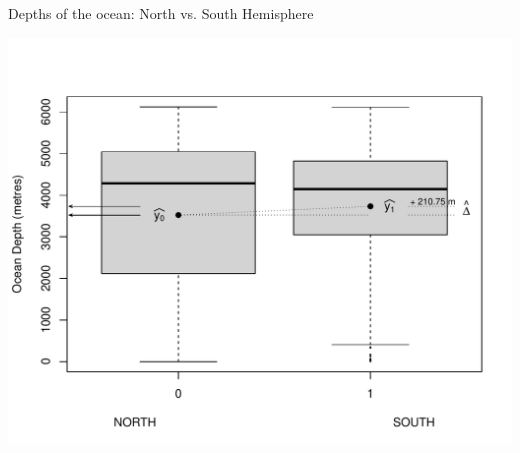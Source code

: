 \documentclass[10pt]{beamer}\usepackage[]{graphicx}\usepackage[]{color}
\makeatletter
\def\maxwidth{ %
  \ifdim\Gin@nat@width>\linewidth
    \linewidth
  \else
    \Gin@nat@width
  \fi
}
\newenvironment{knitrout}{}{} %
\makeatother
\begin{document}
\begin{frame}[fragile]{Depths of the ocean: North vs. South Hemisphere}
	
\begin{knitrout}\tiny
{}\color{fgcolor}

{\centering \includegraphics[width=\maxwidth]{figure/unnamed-chunk-6-1} 

}



\end{knitrout}
	
	
\end{frame}
\end{document}
